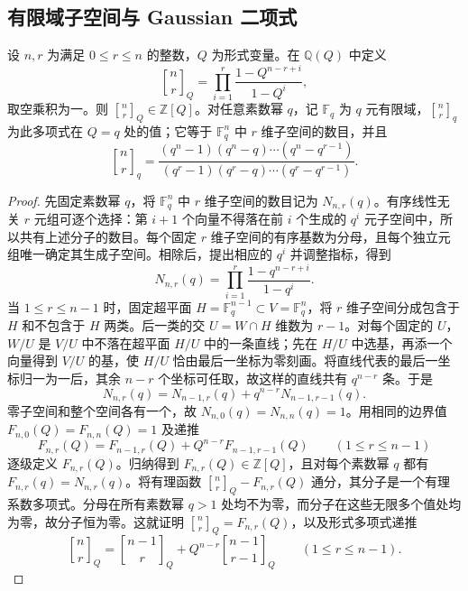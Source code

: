 \subsection{有限域子空间与 Gaussian 二项式}
\label{b5:subsec:A03:03}

\begin{proposition}\label{b5:prop:gaussian-subspace-count}
	设 \(n,r\) 为满足 \(0\le r\le n\) 的整数，\(Q\) 为形式变量。在 \(\mathbb Q(Q)\) 中定义
	\[
		{n\brack r}_Q=\prod_{i=1}^r\frac{1-Q^{n-r+i}}{1-Q^i},
	\]
	取空乘积为一。则 \({n\brack r}_Q\in\mathbb Z[Q]\)。对任意素数幂 \(q\)，记 \(\mathbb F_q\) 为 \(q\) 元有限域，\({n\brack r}_q\) 为此多项式在 \(Q=q\) 处的值；它等于 \(\mathbb F_q^n\) 中 \(r\) 维子空间的数目，并且
	\[
		{n\brack r}_q =\frac{(q^n-1)(q^n-q)\cdots(q^n-q^{r-1})} {(q^r-1)(q^r-q)\cdots(q^r-q^{r-1})}.
	\]
\end{proposition}
\begin{proof}
	先固定素数幂 \(q\)，将 \(\mathbb F_q^n\) 中 \(r\) 维子空间的数目记为 \(N_{n,r}(q)\)。有序线性无关 \(r\) 元组可逐个选择：第 \(i+1\) 个向量不得落在前 \(i\) 个生成的 \(q^i\) 元子空间中，所以共有上述分子的数目。每个固定 \(r\) 维子空间的有序基数为分母，且每个独立元组唯一确定其生成子空间。相除后，提出相应的 \(q^i\) 并调整指标，得到
	\[
		N_{n,r}(q)=\prod_{i=1}^r\frac{1-q^{n-r+i}}{1-q^i}.
	\]
	当 \(1\le r\le n-1\) 时，固定超平面 \(H=\mathbb F_q^{n-1}\subset V=\mathbb F_q^n\)，将 \(r\) 维子空间分成包含于 \(H\) 和不包含于 \(H\) 两类。后一类的交 \(U=W\cap H\) 维数为 \(r-1\)。对每个固定的 \(U\)，\(W/U\) 是 \(V/U\) 中不落在超平面 \(H/U\) 中的一条直线；先在 \(H/U\) 中选基，再添一个向量得到 \(V/U\) 的基，使 \(H/U\) 恰由最后一坐标为零刻画。将直线代表的最后一坐标归一为一后，其余 \(n-r\) 个坐标可任取，故这样的直线共有 \(q^{n-r}\) 条。于是
	\[
		N_{n,r}(q)=N_{n-1,r}(q)+q^{n-r}N_{n-1,r-1}(q).
	\]
	零子空间和整个空间各有一个，故 \(N_{n,0}(q)=N_{n,n}(q)=1\)。用相同的边界值 \(F_{n,0}(Q)=F_{n,n}(Q)=1\) 及递推
	\[
		F_{n,r}(Q)=F_{n-1,r}(Q)+Q^{n-r}F_{n-1,r-1}(Q) \qquad(1\le r\le n-1)
	\]
	逐级定义 \(F_{n,r}(Q)\)。归纳得到 \(F_{n,r}(Q)\in\mathbb Z[Q]\)，且对每个素数幂 \(q\) 都有 \(F_{n,r}(q)=N_{n,r}(q)\)。将有理函数 \({n\brack r}_Q-F_{n,r}(Q)\) 通分，其分子是一个有理系数多项式。分母在所有素数幂 \(q>1\) 处均不为零，而分子在这些无限多个值处均为零，故分子恒为零。这就证明 \({n\brack r}_Q=F_{n,r}(Q)\)，以及形式多项式递推
	\begin{equation}\label{b5:eq:gaussian-recursion}
		{n\brack r}_Q={n-1\brack r}_Q +Q^{n-r}{n-1\brack r-1}_Q \qquad(1\le r\le n-1).
	\end{equation}
\end{proof}

